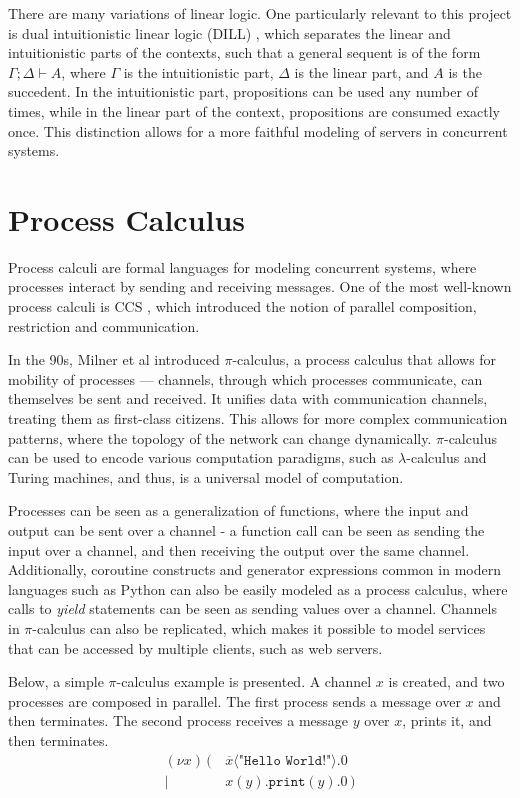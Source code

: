 There are many variations of linear logic. One particularly relevant to this project is dual intuitionistic linear logic (DILL) \cite{Barber:1996}, which separates the linear and intuitionistic parts of the contexts, such that a general sequent is of the form $\Gamma; \Delta \vdash A$, where $\Gamma$ is the intuitionistic part, $\Delta$ is the linear part, and $A$ is the succedent. In the intuitionistic part, propositions can be used any number of times, while in the linear part of the context, propositions are consumed exactly once. This distinction allows for a more faithful modeling of servers in concurrent systems.

\section{Process Calculus}

Process calculi are formal languages for modeling concurrent systems, where processes interact by sending and receiving messages. One of the most well-known process calculi is \acf{CCS} \cite{Milner:1980}, which introduced the notion of parallel composition, restriction and communication.

In the 90s, Milner et al \cite{Milner:1992:1,Milner:1992:2} introduced $\pi$-calculus, a process calculus that allows for mobility of processes --- channels, through which processes communicate, can themselves be sent and received. It unifies data with communication channels, treating them as first-class citizens. This allows for more complex communication patterns, where the topology of the network can change dynamically. $\pi$-calculus can be used to encode various computation paradigms, such as $\lambda$-calculus and Turing machines, and thus, is a universal model of computation.

Processes can be seen as a generalization of functions, where the input and output can be sent over a channel - a function call can be seen as sending the input over a channel, and then receiving the output over the same channel. Additionally, coroutine constructs and generator expressions common in modern languages such as Python can also be easily modeled as a process calculus, where calls to \textit{yield} statements can be seen as sending values over a channel. Channels in $\pi$-calculus can also be replicated, which makes it possible to model services that can be accessed by multiple clients, such as web servers.

Below, a simple $\pi$-calculus example is presented. A channel $x$ is created, and two processes are composed in parallel. The first process sends a message over $x$ and then terminates. The second process receives a message $y$ over $x$, prints it, and then terminates.
\[\begin{aligned}
        (\nu x)\,(\, & \overline{x}\langle\texttt{"Hello World!"}\rangle.0 \\
        |\           & x(y).\texttt{print}(y).0\,)
\end{aligned}\]

